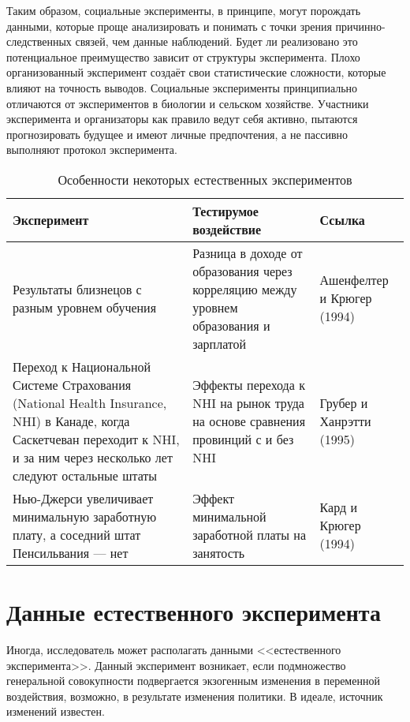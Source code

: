 Таким образом, социальные эксперименты, в принципе, могут порождать данными, которые проще анализировать и понимать с точки зрения причинно-следственных связей, чем данные наблюдений. Будет ли реализовано это потенциальное преимущество зависит от структуры эксперимента. Плохо организованный эксперимент создаёт свои статистические сложности, которые влияют на точность выводов. Социальные эксперименты принципиально отличаются от экспериментов в биологии и сельском хозяйстве. Участники эксперимента и организаторы как правило ведут себя активно, пытаются прогнозировать будущее и имеют личные предпочтения, а не пассивно выполняют протокол эксперимента.

\begin{table}[h]
\begin{center}
\caption{\label{tab:natfeature}Особенности некоторых естественных экспериментов}
\begin{tabular}[t]{p{6cm}p{4cm}p{4cm}}
\hline
\hline
\bf{Эксперимент} & \bf{Тестирумое воздействие} & \bf{Ссылка} \\
\hline
Результаты близнецов с разным уровнем обучения &  Разница в доходе от образования через корреляцию между уровнем образования и зарплатой  & Ашенфелтер и Крюгер (1994) \\
Переход к Национальной Системе Страхования (National Health Insurance, NHI) в Канаде, когда Саскетчеван переходит к NHI, и за ним через несколько лет следуют остальные штаты  & Эффекты перехода к NHI на рынок труда на основе сравнения провинций с и без NHI & Грубер и Ханрэтти (1995) \\
Нью-Джерси увеличивает минимальную заработную плату, а соседний штат Пенсильвания --- нет & Эффект минимальной заработной платы на занятость & Кард и Крюгер (1994) \\
\hline
\hline
\end{tabular}
\end{center}
\end{table}



\section{Данные естественного эксперимента}


Иногда, исследователь может располагать данными <<естественного эксперимента>>. Данный эксперимент возникает, если подмножество генеральной совокупности подвергается экзогенным изменения в переменной воздействия, возможно, в результате изменения политики.  В идеале, источник изменений известен.


